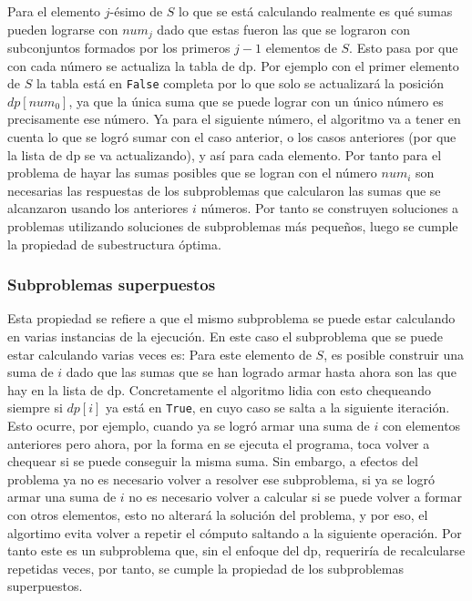 \documentclass[11pt]{article}
\begin{document}
    Para el elemento $j$-ésimo de $S$ lo que se está calculando realmente es qué sumas pueden lograrse con $num_j$ dado que estas fueron
    las que se lograron con subconjuntos formados por los primeros $j-1$ elementos de $S$. Esto pasa por que con cada número se actualiza
    la tabla de dp. Por ejemplo con el primer elemento de $S$ la tabla está en \texttt{False} completa por lo que solo se actualizará la posición
    $dp[num_0]$, ya que la única suma que se puede lograr con un único número es precisamente ese número. Ya para el siguiente número, el algoritmo
    va a tener en cuenta lo que se logró sumar con el caso anterior, o los casos anteriores (por que la lista de dp se va actualizando), y así para 
    cada elemento. Por tanto para el problema de hayar las sumas posibles que se logran con el número $num_i$ son necesarias las respuestas de los 
    subproblemas que calcularon las sumas que se alcanzaron usando los anteriores $i$ números. Por tanto se construyen soluciones a problemas utilizando 
    soluciones de subproblemas más pequeños, luego se cumple la propiedad de subestructura óptima.

    \subsubsection{Subproblemas superpuestos}
    Esta propiedad se refiere a que el mismo subproblema se puede estar calculando en varias instancias de la ejecución. En
    este caso el subproblema que se puede estar calculando varias veces es: Para este elemento de $S$, es posible construir una 
    suma de $i$ dado que las sumas que se han logrado armar hasta ahora son las que hay en la lista de dp. Concretamente el algoritmo
    lidia con esto chequeando siempre si $dp[i]$ ya está en \texttt{True}, en cuyo caso se salta a la siguiente iteración. Esto
    ocurre, por ejemplo, cuando ya se logró armar una suma de $i$ con elementos anteriores pero ahora, por la forma en se ejecuta
    el programa, toca volver a chequear si se puede conseguir la misma suma. Sin embargo, a efectos del problema ya no es necesario
    volver a resolver ese subproblema, si ya se logró armar una suma de $i$ no es necesario volver a calcular si se puede volver a formar
    con otros elementos, esto no alterará la solución del problema, y por eso, el algortimo evita volver a repetir el cómputo saltando
    a la siguiente operación. Por tanto este es un subproblema que, sin el enfoque del dp, requeriría de recalcularse repetidas veces, por
    tanto, se cumple la propiedad de los subproblemas superpuestos.
\end{document}

